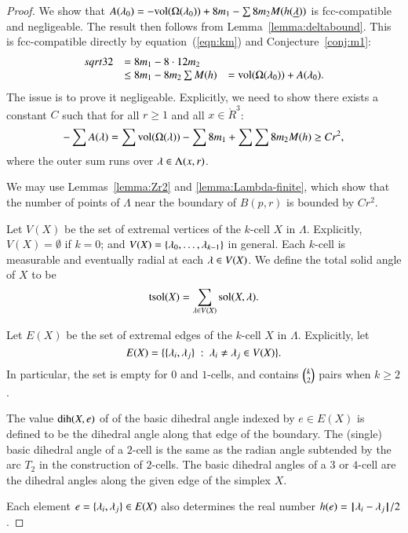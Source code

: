 \begin{proof} 
We show that $A(\lambda_0)  = -{\operatorname{vol}}(\Omega(\lambda_0)) + 8 m_1 - \sum 8 m_2 M(h({\underline{\lambda}}))$ is fcc-compatible and negligeable.  The
result then follows from Lemma~\ref{lemma:deltabound}.  
This is fcc-compatible directly
by equation~(\ref{eqn:km})
and Conjecture~\ref{conj:m1}:
$$
\begin{array}{lll}
sqrt{32} &= 8 m_1 - 8\cdot 12 m_2\\
  &\le 8 m_1 - 8 m_2 \sum M(h)
  &= {\operatorname{vol}}(\Omega(\lambda_0)) + A(\lambda_0).
\end{array}
$$  
The issue is to prove it negligeable.  Explicitly, we need
to show there exists a constant  $C$ such that for all $r\ge 1$ and all $x\in\ring{R}^3$:
\begin{equation}\label{eqn:neg}
  -\sum A(\lambda) = \sum {\operatorname{vol}}(\Omega(\lambda)) -\sum 8m_1 + \sum \sum 8 m_2 M(h) \ge C r^2,
\end{equation}
where the outer sum runs over $\lambda\in \Lambda(x,r)$.

We may use Lemmas~\ref{lemma:Zr2} and \ref{lemma:Lambda-finite}, which show that the number of points of $\Lambda$ near the boundary of $B(p,r)$ is bounded by $C r^2$.

Let $V(X)$ be the set of extremal vertices of the $k$-cell $X$ in $\Lambda$.  Explicitly, $V(X)=\emptyset$ if $k=0$; and $V(X) = \{\lambda_0,\ldots,\lambda_{k-1}\}$ in general.  Each $k$-cell is measurable and eventually
radial at each $\lambda\in V(X)$.  We define the total solid angle of $X$ to be
$$
{\operatorname{tsol}}(X) = \sum_{\lambda\in V(X)} \operatorname{sol}(X,\lambda).
$$

Let $E(X)$ be the set of extremal edges of the $k$-cell $X$ in $\Lambda$.  Explicitly, let 
$$E(X)=\{\{\lambda_i,\lambda_j\}\ :\  \lambda_i\ne\lambda_j\in V(X)\}.$$
In particular, the set is empty for $0$ and $1$-cells, and contains
$\tbinom{k}{2}$ pairs when $k\ge 2$.


The value
$\operatorname{dih}(X,e)$ of
of the basic dihedral angle indexed by $e\in E(X)$ is defined to be the dihedral angle along that edge
of the boundary.  
The (single) basic  dihedral angle of a $2$-cell is
the same as the radian angle subtended by the arc $T_2$ in the construction of $2$-cells.
The basic dihedral angles of a $3$ or $4$-cell are the dihedral angles along the given edge of the simplex $X$. 

Each element $e=\{\lambda_i,\lambda_j\}\in E(X)$ also determines
the real number $h(e) = {\hskip0.1em|\hskip-0.15em|\hskip0.1em}\lambda_i - \lambda_j{\hskip0.1em|\hskip-0.15em|\hskip0.1em}/2$.


\end{proof}

